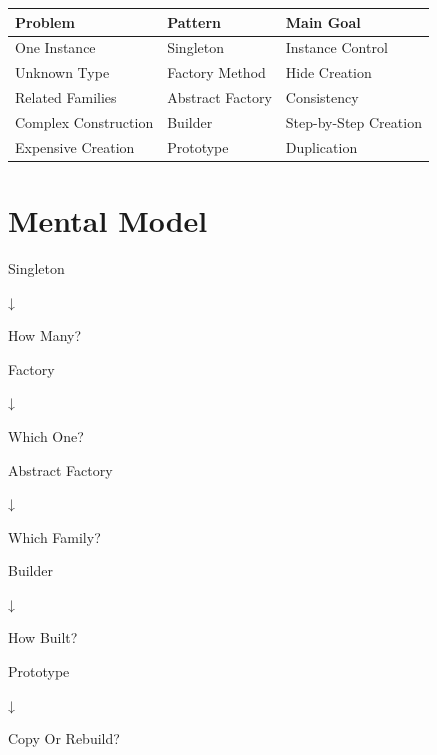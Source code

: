 \documentclass[11pt,a4paper]{book}
\begin{document}
\begin{center}
\begin{tabular}{lll}

\toprule

Problem &
Pattern &
Main Goal

\\

\midrule

One Instance &
Singleton &
Instance Control

\\

Unknown Type &
Factory Method &
Hide Creation

\\

Related Families &
Abstract Factory &
Consistency

\\

Complex Construction &
Builder &
Step-by-Step Creation

\\

Expensive Creation &
Prototype &
Duplication

\\

\bottomrule

\end{tabular}
\end{center}


\section{Mental Model}

\begin{mentalmodel}

Singleton

↓

How Many?

\vspace{0.5em}

Factory

↓

Which One?

\vspace{0.5em}

Abstract Factory

↓

Which Family?

\vspace{0.5em}

Builder

↓

How Built?

\vspace{0.5em}

Prototype

↓

Copy Or Rebuild?

\end{mentalmodel}
\end{document}
